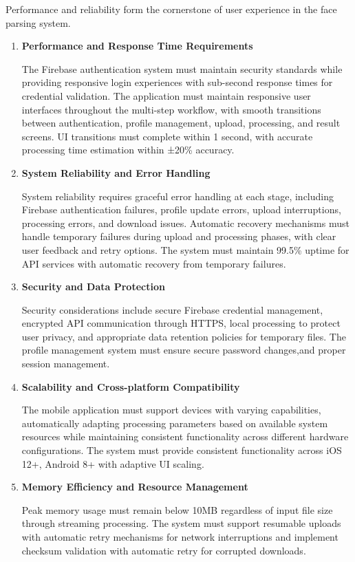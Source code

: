 \documentclass[12pt,a4paper]{report}
\begin{document}
Performance and reliability form the cornerstone of user experience in the face parsing system.

\begin{enumerate}[label=\Roman*.]
\item \textbf{Performance and Response Time Requirements}

The Firebase authentication system must maintain security standards while providing responsive login experiences with sub-second response times for credential validation. The application must maintain responsive user interfaces throughout the multi-step workflow, with smooth transitions between authentication, profile management, upload, processing, and result screens. UI transitions must complete within 1 second, with accurate processing time estimation within ±20\% accuracy.

\item \textbf{System Reliability and Error Handling}

System reliability requires graceful error handling at each stage, including Firebase authentication failures, profile update errors, upload interruptions, processing errors, and download issues. Automatic recovery mechanisms must handle temporary failures during upload and processing phases, with clear user feedback and retry options. The system must maintain 99.5\% uptime for API services with automatic recovery from temporary failures.

\item \textbf{Security and Data Protection}

Security considerations include secure Firebase credential management, encrypted API communication through HTTPS, local processing to protect user privacy, and appropriate data retention policies for temporary files. The profile management system must ensure secure password changes,and proper session management.

\item \textbf{Scalability and Cross-platform Compatibility}

The mobile application must support devices with varying capabilities, automatically adapting processing parameters based on available system resources while maintaining consistent functionality across different hardware configurations. The system must provide consistent functionality across iOS 12+, Android 8+ with adaptive UI scaling.

\item \textbf{Memory Efficiency and Resource Management}

Peak memory usage must remain below 10MB regardless of input file size through streaming processing. The system must support resumable uploads with automatic retry mechanisms for network interruptions and implement checksum validation with automatic retry for corrupted downloads.
\end{enumerate}
\end{document}
